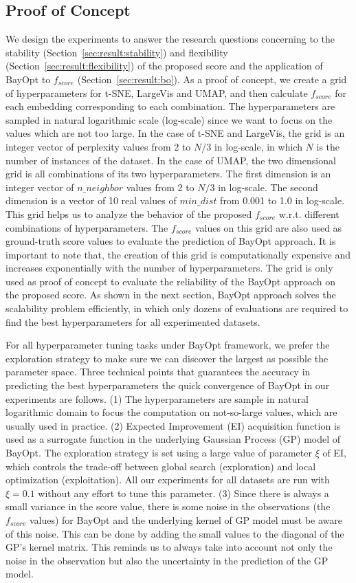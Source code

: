 \subsection{Proof of Concept}\label{sec:xp:proof}
We design the experiments to answer the research questions concerning to the stability (Section~\ref{sec:result:stability}) and flexibility (Section~\ref{sec:result:flexibility}) of the proposed score and the application of BayOpt to $f_{score}$ (Section~\ref{sec:result:bo}).
As a proof of concept, we create a grid of hyperparameters for t-SNE, LargeVis and UMAP, and then calculate $f_{score}$ for each embedding corresponding to each combination.
The hyperparameters are sampled in natural logarithmic scale (log-scale) since we want to focus on the values which are not too large.
In the case of t-SNE and LargeVis, the grid is an integer vector of perplexity values from 2 to $N/3$ in log-scale, in which $N$ is the number of instances of the dataset.
In the case of UMAP, the two dimensional grid is all combinations of its two hyperparameters.
The first dimension is an integer vector of $n\_neighbor$ values from 2 to $N/3$ in log-scale.
The second dimension is a vector of 10 real values of $min\_dist$ from 0.001 to 1.0 in log-scale.
This grid helps us to analyze the behavior of the proposed $f_{score}$ w.r.t. different combinations of hyperparameters.
The $f_{score}$ values on this grid are also used as ground-truth score values to evaluate the prediction of BayOpt approach.
It is important to note that, the creation of this grid is computationally expensive and increases exponentially with the number of hyperparameters.
The grid is only used as proof of concept to evaluate the reliability of the BayOpt approach on the proposed score.
As shown in the next section, BayOpt approach solves the scalability problem efficiently, in which only dozens of evaluations are required to find the best hyperparameters for all experimented datasets.

For all hyperparameter tuning tasks under BayOpt framework, we prefer the exploration strategy to make sure we can discover the largest as possible the parameter space.
Three technical points that guarantees the accuracy in predicting the best hyperparameters the quick convergence of BayOpt in our experiments are follows.
(1) The hyperparameters are sample in natural logarithmic domain to focus the computation on not-so-large values, which are usually used in practice.
(2) Expected Improvement (EI) acquisition function is used as a surrogate function in the underlying Gaussian Process (GP) model of BayOpt.
The exploration strategy is set using a large value of parameter $\xi$ of EI, which controls the trade-off between global search (exploration) and local optimization (exploitation).
All our experiments for all datasets are run with $\xi=0.1$ without any effort to tune this parameter.
(3) Since there is always a small variance in the score value, there is some noise in the observations (the $f_{score}$ values) for BayOpt and the underlying kernel of GP model must be aware of this noise.
This can be done by adding the small values to the diagonal of the GP's kernel matrix.
This reminds us to always take into account not only the noise in the observation but also the uncertainty in the prediction of the GP model.

